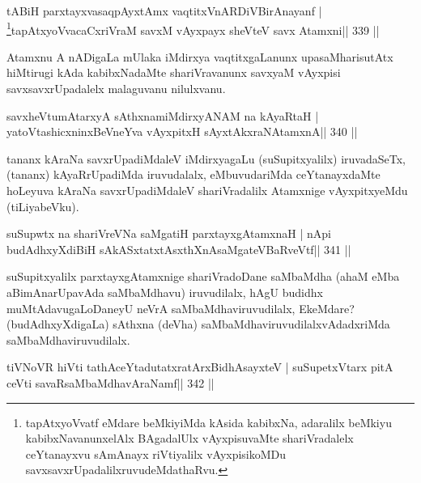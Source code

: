 \begin{shl}
tABiH parxtayxvasaqpAyx\s\s tAmx vaqtitxVnARDiVBirAnayanf |
\footnote{tapAtxyoVvatf eMdare beMkiyiMda kAsida kabibxNa, adaralilx beMkiyu kabibxNavanunx\break elAlx BAgadalUlx vAyxpisuvaMte  shariVradalelx ceYtanayxvu sAmAnayx riVtiyalilx vAyxpisikoMDu  savxsavxrUpadalilxruvudeMdathaRvu.}tapAtxyoVvacaCxriVraM savxM vAyxpayx sheVteV savx Atamxni\hfill || 339 ||
\end{shl}

\begin{artha}
Atamxnu A nADigaLa mUlaka iMdirxya vaqtitxgaLanunx upasaMharisutAtx  hiMtirugi kAda kabibxNadaMte shariVravanunx savxyaM vAyxpisi savxsavxrUpadalelx malaguvanu nilulxvanu.
\end{artha}


\begin{shl}
savxheVtumAtarxyA sAthxnamiMdirxyANAM na kAyaRtaH |
yatoV\s tashicxninxBeVneYva vAyxpitxH sAyxtAkxraNAtamxnA\hfill || 340 ||
\end{shl}

\begin{artha}
tananx kAraNa savxrUpadiMdaleV iMdirxyagaLu (suSupitxyalilx)  iruvadaSeTx, (tananx) kAyaRrUpadiMda iruvudalalx, eMbuvudariMda ceYtanayxdaMte hoLeyuva kAraNa savxrUpadiMdaleV shariVradalilx Atamxnige vAyxpitxyeMdu (tiLiyabeVku).
\end{artha}


\begin{shl}
suSupwtx na shariVreVNa saMgatiH parxtayxgAtamxnaH |
nApi budAdhxyXdiBiH sAkASxtatxtAsxthXnAsaMgateVBaRveVtf\hfill || 341 ||
\end{shl}

\begin{artha}
suSupitxyalilx parxtayxgAtamxnige shariVradoDane saMbaMdha (ahaM eMba  aBimAnarUpavAda saMbaMdhavu) iruvudilalx, hAgU budidhx  muMtAdavugaLoDaneyU neVrA saMbaMdhaviruvudilalx, EkeMdare? (budAdhxyXdigaLa) sAthxna (deVha) saMbaMdhaviruvudilalxvAdadxriMda saMbaMdhaviruvudilalx.
\end{artha}


\begin{shl}
tiVNoVR hiVti tathAceYtadutatxratArxBidhAsayxteV |
suSupetxV\s tarx pitA ceVti savaRsaMbaMdhavAraNamf\hfill || 342 ||
\end{shl}

